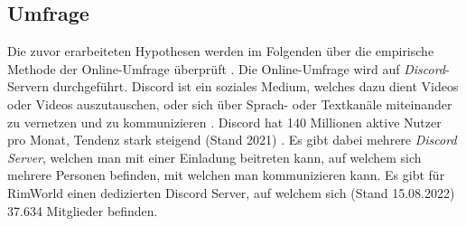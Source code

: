 \subsection{Umfrage}
Die zuvor erarbeiteten Hypothesen werden im Folgenden über die empirische Methode der Online-Umfrage überprüft \cite*[]{Evans2005TheVO}.  Die Online-Umfrage wird auf \textit{Discord}-Servern durchgeführt. Discord ist ein soziales Medium, welches dazu dient Videos oder Videos auszutauschen, oder sich über Sprach- oder Textkanäle miteinander zu vernetzen und zu kommunizieren \cite*[]{discord:usage}. Discord hat 140 Millionen aktive Nutzer pro Monat, Tendenz stark steigend (Stand 2021) \cite*[]{discord:statistics}. Es gibt dabei mehrere \textit{Discord Server}, welchen man mit einer Einladung beitreten kann, auf welchem sich mehrere Personen befinden, mit welchen man kommunizieren kann. Es gibt für RimWorld einen dedizierten Discord Server, auf welchem sich (Stand 15.08.2022) 37.634 Mitglieder befinden.
